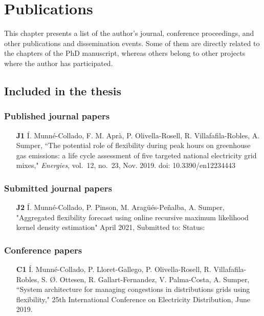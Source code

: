 \chapter{Publications}
This chapter presents a list of the author's journal, conference proceedings, and other publications and dissemination events. Some of them are directly related to the chapters of the PhD manuscript, whereas others belong to other projects where the author has participated. 

\section*{Included in the thesis}
\subsection*{Published journal papers}

\begin{itemize}
	
	\item[\textbf{J1}] \'{I}. Munn\'{e}-Collado, F. M. Apr\`{a}, P. Olivella-Rosell, R. Villafafila-Robles, A. Sumper, ``The potential role of flexibility during peak hours on greenhouse gas emissions: a life cycle assessment of five targeted national electricity grid mixes," \textit{Energies}, vol.~12, no.~23, Nov. 2019. doi: 10.3390/en12234443
	
\end{itemize}

\subsection*{Submitted journal papers}
\begin{itemize}
	\item [\textbf{J2}] \'{I}. Munn\'{e}-Collado, P. Pinson, M. Arag\"{u}\'{e}s-Pe\~{n}alba, A. Sumper, "Aggregated flexibility forecast using online recursive maximum likelihood kernel density estimation" April 2021, Submitted to:  Status:
\end{itemize}

\subsection*{Conference papers}

\begin{itemize}
	\item[\textbf{C1}] \'{I}. Munn\'{e}-Collado, P. Lloret-Gallego, P. Olivella-Rosell, R. Villafafila-Robles, S. \O{}. Ottesen, R. Gallart-Fernandez, V. Palma-Costa, A. Sumper, ``System architecture for managing congestions in distributions grids using flexibility," 25th International Conference on Electricity Distribution, June 2019.
\end{itemize}

